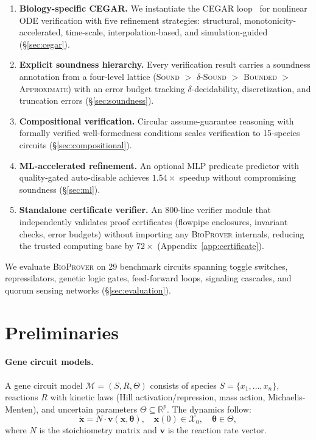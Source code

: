 \documentclass[11pt]{article}
\newcommand{\bioprover}{\textsc{BioProver}}
\newcommand{\cegar}{\textsc{CEGAR}}
\newcommand{\RR}{\mathbb{R}}
\begin{document}
\begin{enumerate}[leftmargin=*,itemsep=2pt]
\item \textbf{Biology-specific \cegar{}.} We instantiate the \cegar{}
  loop~\cite{clarke2000cegar} for nonlinear ODE verification with
  five refinement strategies: structural, monotonicity-accelerated,
  time-scale, interpolation-based, and simulation-guided
  (\S\ref{sec:cegar}).

\item \textbf{Explicit soundness hierarchy.} Every verification
  result carries a soundness annotation from a four-level lattice
  (\textsc{Sound} $>$ \textsc{$\delta$-Sound} $>$ \textsc{Bounded}
  $>$ \textsc{Approximate}) with an error budget tracking
  $\delta$-decidability, discretization, and truncation errors
  (\S\ref{sec:soundness}).

\item \textbf{Compositional verification.} Circular assume-guarantee
  reasoning with formally verified well-formedness conditions scales
  verification to 15-species circuits (\S\ref{sec:compositional}).

\item \textbf{ML-accelerated refinement.} An optional MLP predicate
  predictor with quality-gated auto-disable achieves $1.54\times$
  speedup without compromising soundness (\S\ref{sec:ml}).

\item \textbf{Standalone certificate verifier.} An 800-line verifier
  module that independently validates proof certificates (flowpipe
  enclosures, invariant checks, error budgets) without importing any
  \bioprover{} internals, reducing the trusted computing base by
  $72\times$ (Appendix~\ref{app:certificate}).
\end{enumerate}

\noindent We evaluate \bioprover{} on 29 benchmark circuits spanning
toggle switches, repressilators, genetic logic gates,
feed-forward loops, signaling cascades, and quorum sensing networks
(\S\ref{sec:evaluation}).

\section{Preliminaries}
\label{sec:prelim}

\paragraph{Gene circuit models.}
A gene circuit model $\mathcal{M} = (S, R, \Theta)$ consists of
species $S = \{x_1, \ldots, x_n\}$, reactions $R$ with kinetic laws
(Hill activation/repression, mass action, Michaelis-Menten), and
uncertain parameters $\Theta \subseteq \RR^p$. The dynamics follow:
\begin{equation}
  \dot{\mathbf{x}} = N \cdot \mathbf{v}(\mathbf{x}, \boldsymbol\theta),
  \quad \mathbf{x}(0) \in \mathcal{X}_0, \quad \boldsymbol\theta \in \Theta,
\end{equation}
where $N$ is the stoichiometry matrix and $\mathbf{v}$ is the reaction
rate vector.
\end{document}
